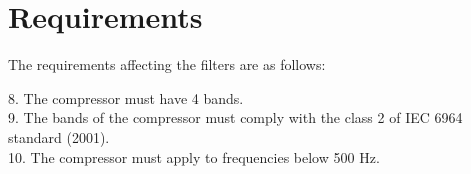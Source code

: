 \section{Requirements}
The requirements affecting the filters are as follows:

8. The compressor must have 4 bands. \\
9. The bands of the compressor must comply with the class 2 of IEC 6964 standard (2001). \\
10. The compressor must apply to frequencies below 500 Hz. 
 

 
 

